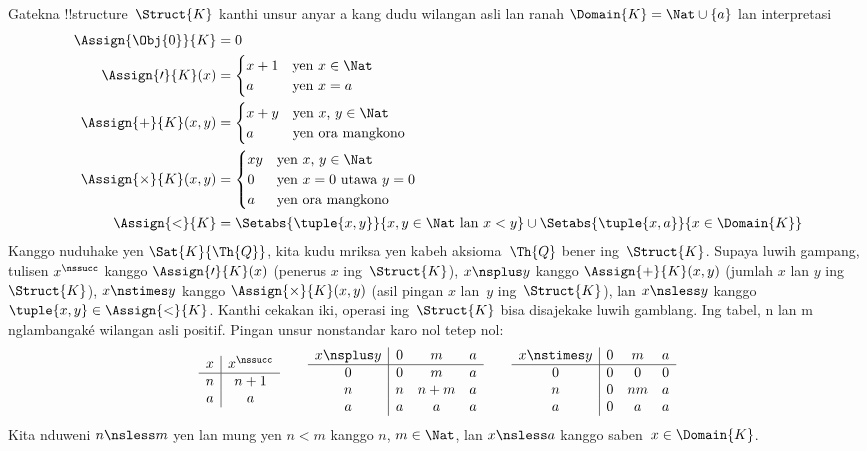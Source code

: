 \documentclass[../../../include/open-logic-section]{subfiles}
\begin{document}
\begin{ex}
Gatekna !!{structure}~$\Struct{K}$
kanthi unsur anyar a kang dudu wilangan asli lan ranah
$\Domain{K} = \Nat
\cup \{a\}$ lan interpretasi
\begin{align*}
  \Assign{\Obj{0}}{K} & = 0\\
  \Assign{\prime}{K}(x) & =
  \begin{cases}
    x+1 & \text{yen $x\in \Nat$}\\
    a & \text{yen $x = a$}
  \end{cases}\\
  \Assign{+}{K}(x, y) & =
  \begin{cases}
    x+y & \text{yen $x$, $y \in\Nat$}\\
    a & \text{yen ora mangkono}
  \end{cases}\\
  \Assign{\times}{K}(x, y) & =
  \begin{cases}
    xy & \text{yen $x$, $y \in\Nat$}\\
    0 & \text{yen $x = 0$ utawa $y = 0$}\\
    a & \text{yen ora mangkono}\\
  \end{cases}\\
  \Assign{<}{K} & =
  \Setabs{\tuple{x,y}}{x, y \in \Nat \text{ lan } x<y} \cup
  \Setabs{\tuple{x,a}}{x \in \Domain{K}}
\end{align*}
Kanggo nuduhake yen
$\Sat{K}{\Th{Q}}$,
kita kudu mriksa yen
kabeh aksioma~$\Th{Q}$
bener ing~$\Struct{K}$.
Supaya luwih gampang,
tulisen $x^\nssucc$
kanggo $\Assign{\prime}{K}(x)$
(penerus $x$
ing~$\Struct{K}$),
$x \nsplus y$
kanggo $\Assign{+}{K}(x, y)$
(jumlah $x$ lan $y$
ing~$\Struct{K}$),
$x \nstimes y$
kanggo $\Assign{\times}{K}(x, y)$
(asil pingan $x$ lan~$y$
ing~$\Struct{K}$),
lan $x \nsless y$
kanggo $\tuple{x,y} \in
\Assign{<}{K}$.
Kanthi cekakan iki,
operasi ing~$\Struct{K}$
bisa disajekake luwih gamblang. Ing tabel, n lan m nglambangaké wilangan asli positif. Pingan unsur nonstandar karo nol tetep nol:
\[
\begin{array}{c|c}
  x & x^\nssucc \\
  \hline
  n & n+1 \\
  a & a
\end{array}
\qquad
\begin{array}{c|ccc}
  x \nsplus y & 0 & m & a \\
  \hline
  0 & 0 & m & a \\
  n & n & n+m & a \\
  a & a & a & a \\
\end{array}
\qquad
\begin{array}{c|ccc}
  x \nstimes y & 0 & m & a \\
  \hline
  0 & 0 & 0 & 0 \\
  n & 0 & nm & a \\
  a & 0 & a & a \\
\end{array}
\]
Kita nduweni
$n \nsless m$ yen lan mung yen
$n<m$ kanggo $n$,
$m \in \Nat$,
lan $x \nsless a$
kanggo saben~$x \in \Domain{K}$.


\end{ex}
\end{document}
